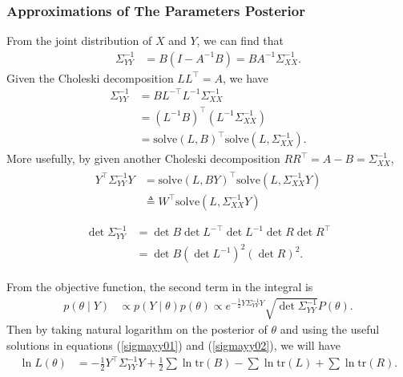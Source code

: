 \subsubsection{Approximations of The Parameters Posterior}

From the joint distribution of $X$ and $Y$, we can find that  
\begin{align*}
\Sigma_{YY}^{-1} &= B(I-A^{-1}B)= BA^{-1}\Sigma_{XX}^{-1}.
\end{align*}
Given the Choleski decomposition $LL^\top = A$, we have
\begin{align*}
\Sigma_{YY}^{-1} &=BL^{-\top}L^{-1}\Sigma_{XX}^{-1}\\
&=(L^{-1}B)^\top(L^{-1}\Sigma_{XX}^{-1})\\
&=\mbox{solve}(L,B)^\top\mbox{solve}(L,\Sigma_{XX}^{-1}).
\end{align*}
More usefully, by given another Choleski decomposition $RR^\top=A-B=\Sigma_{XX}^{-1}$,
\begin{align}\label{sigmayy01}
\begin{split}
Y^\top \Sigma_{YY}^{-1} Y &= \mbox{solve}(L,BY)^\top\mbox{solve}(L,\Sigma_{XX}^{-1}Y)\\
&\triangleq W^\top \mbox{solve}(L,\Sigma_{XX}^{-1}Y)\\
\end{split}
\end{align}
\begin{align}\label{sigmayy02}
\begin{split}
\det\Sigma_{YY}^{-1} &= \det B \det L^{-\top}\det L^{-1}\det R\det R^\top\\
&= \det B(\det L^{-1})^2(\det R)^2.
\end{split}
\end{align}

From the objective function, the second term in the integral is
\begin{align*}
p(\theta \mid Y) &\propto p(Y\mid\theta)p(\theta) \propto e^{-\frac{1}{2} Y \Sigma_{YY}^{-1} Y } \sqrt{\det \Sigma_{YY}^{-1}} P(\theta).
\end{align*}
Then by taking natural logarithm on the posterior of $\theta$ and using the useful solutions in equations (\ref{sigmayy01}) and (\ref{sigmayy02}), we will have
\begin{align}\label{logL}
\ln L(\theta) &= -\frac{1}{2}Y^\top\Sigma_{YY}^{-1}Y+\frac{1}{2}\sum\ln\mbox{tr}(B)-\sum\ln\mbox{tr}(L)+\sum\ln\mbox{tr}(R).
\end{align}





